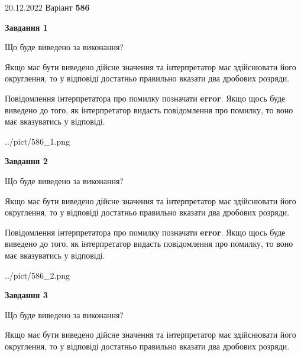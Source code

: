 \documentclass[12pt, ukrainian]{article}
\begin{document}
{20.12.2022 Варіант \No \textbf { 586 }\par}
{
\begin {Large}

{\begin {center}\textbf{Завдання 1}\end {center}}\par
Що буде виведено за виконання? \par

Якщо має бути виведено дійсне значення та інтерпретатор має здійснювати його округлення, 
то у відповіді достатньо правильно вказати два дробових розряди.

Повідомлення інтерпретатора про помилку позначати \textbf{error}.
Якщо щось буде виведено до того, як інтерпретатор видасть повідомлення про помилку, 
то воно має вказуватись у відповіді. \par

\begin{center}
	{../pict/586_1.png}
\end{center}
\newpage

{\begin {center}\textbf{Завдання 2}\end {center}}\par
Що буде виведено за виконання? \par

Якщо має бути виведено дійсне значення та інтерпретатор має здійснювати його округлення, 
то у відповіді достатньо правильно вказати два дробових розряди.

Повідомлення інтерпретатора про помилку позначати \textbf{error}.
Якщо щось буде виведено до того, як інтерпретатор видасть повідомлення про помилку, 
то воно має вказуватись у відповіді. \par

\begin{center}
	{../pict/586_2.png}
\end{center}
\newpage

{\begin {center}\textbf{Завдання 3}\end {center}}\par
Що буде виведено за виконання? \par

Якщо має бути виведено дійсне значення та інтерпретатор має здійснювати його округлення, 
то у відповіді достатньо правильно вказати два дробових розряди.


\end{Large}}
\end{document}
